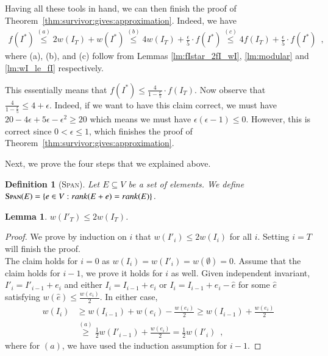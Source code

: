 \documentclass[11pt]{article}
\newtheorem{lemma}[theorem]{Lemma}
\newtheorem{definition}{Definition}[section]
\newcommand{\spn}{{\textsc{Span}}}
\begin{document}
Having all these tools in hand, we can then finish the proof of 
Theorem~\ref{thm:survivor:gives:approximation}. 
Indeed, we have 
    \begin{align}
        f(I^*) \overset{(a)}{\le} 2w(I_T) + w(I^*) \overset{(b)}{\le} 4w(I_T) + \frac{\epsilon}{5} \cdot f(I^*) \overset{(c)}{\le} 4f(I_T) + \frac{\epsilon}{5} \cdot f(I^*) \enspace,
    \end{align}
    where (a), (b), and (c) follow from Lemmas \ref{lm:fIstar_2fI_wI}, 
    \ref{lm:modular} and \ref{lm:wI_le_fI} respectively.
    
This essentially means that     
$f(I^*) \le \frac{4}{1-\frac{\epsilon}{5}} \cdot f(I_T)$. 
Now observe that $\frac{4}{1-\frac{\epsilon}{5}} \le 4+\epsilon$. 
Indeed, if we want to have this claim correct, we must have $20 - 4\epsilon + 5\epsilon - \epsilon^2 \ge 20$ 
which means we must have $ \epsilon(\epsilon-1) \le 0$. 
However, this is correct since $0 < \epsilon \le 1$, which finishes the proof of Theorem~\ref{thm:survivor:gives:approximation}. 




Next, we prove the four steps that we explained above. 


\begin{definition}[\spn]
\label{def:matroid:span}
    Let $E \subseteq V$ be a set of elements. We define $\spn(E) = \{e \in V : rank(E + e) = rank(E) \}$.
\end{definition}



\begin{lemma}
    \label{lm:wK_le_wI}
    $w(I'_T) \le 2w(I_T)$.
\end{lemma}

\begin{proof}
    We prove by induction on $i$ that
    $w(I'_i) \le 2w(I_i)$ for all $i$. Setting $i=T$ will finish the proof.~\\
    The claim holds for $i=0$ as $w(I_i) = w(I'_i) = w(\emptyset) = 0$.
    Assume that the claim holds for $i-1$, we prove it holds for $i$ as well.
    Given independent invariant, 
    $I'_{i} = I'_{i-1} + e_i$ 
    and either $I_{i} = I_{i-1} + e_i$ or
    $I_{i} = I_{i-1} + e_i - \hat{e}$ for some $\hat{e}$ satisfying
    $w(\hat{e}) \le \frac{w(e_i)}{2}$. In either case,
    \begin{align*}
        w(I_{i}) &\ge w(I_{i-1}) + w(e_i) - \frac{w(e_i)}{2}
        \ge w(I_{i-1}) + \frac{w(e_i)}{2}
        \\&\overset{(a)}{\ge} \frac{1}{2}w(I'_{i-1}) + \frac{w(e_i)}{2}
        = \frac{1}{2} w(I'_{i}) \enspace,
    \end{align*}
    where for $(a)$, we have used the induction assumption for $i-1$.
\end{proof}
\end{document}

